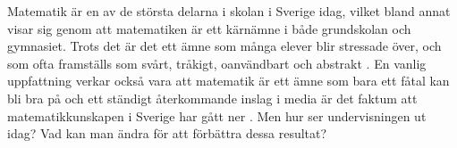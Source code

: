 \textcolor{lila}{Matematik är en av de största delarna i skolan i Sverige idag, vilket bland annat visar sig genom att matematiken är ett kärnämne i både grundskolan och gymnasiet. Trots det är det ett ämne som många elever blir stressade över, och som ofta framställs som svårt, tråkigt, oanvändbart och abstrakt \cite{Ignacio&Barona}. En vanlig uppfattning verkar också vara att matematik är ett ämne som bara ett fåtal kan bli bra på \cite{Skolverket03} och ett ständigt återkommande inslag i media är det faktum att matematikkunskapen i Sverige har gått ner \cite{CompareOECD}. Men hur ser undervisningen ut idag? Vad kan man ändra för att förbättra dessa resultat?}

